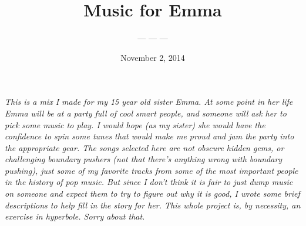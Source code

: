 \documentclass[letterpaper,single]{article}
\title{Music for Emma}
\date{November 2, 2014}
\author{--- --- --- }
\begin{document}
 
\maketitle
\textit{This is a mix I made for my 15 year old sister Emma. At some point in
her life Emma will be at a party full of cool smart people, and someone
will ask her to pick some music to play. I would hope (as my sister) she
would have the confidence to spin some tunes that would make me proud
and jam the party into the appropriate gear. The songs selected here
are not obscure hidden gems, or challenging boundary pushers (not that
there's anything wrong with boundary pushing), just some of my favorite
tracks from some of the most important people in the history of pop
music. But since I don't think it is fair to just dump music on someone
and expect them to try to figure out why it is good, I wrote some brief
descriptions to help fill in the story for her. This whole project is,
by necessity, an exercise in hyperbole. Sorry about that.}\\
\\
\end{document}
